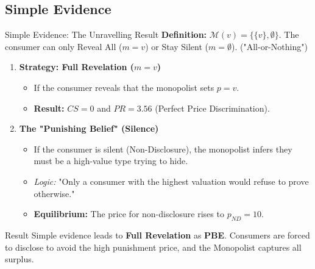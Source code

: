 \documentclass{beamer}
\begin{document}
\subsection{Simple Evidence}
\begin{frame}{Simple Evidence: The Unravelling Result}
    \textbf{Definition:} $\mathcal{M}(v) = \{ \{v\}, \emptyset \}$. The consumer can only Reveal All ($m=v$) or Stay Silent ($m=\emptyset$). ("All-or-Nothing")

    \vspace{0.3cm}

    \begin{enumerate}
        \item \textbf{Strategy: Full Revelation ($m=v$)}
        \begin{itemize}
            \item If the consumer reveals that the monopolist sets $p=v$.
            \item \textbf{Result:} $CS=0$ and $PR = 3.56$ (Perfect Price Discrimination).
        \end{itemize}
        
        \vspace{0.2cm}
        \item \textbf{The "Punishing Belief" (Silence)}
        \begin{itemize}
            \item If the consumer is silent (Non-Disclosure), the monopolist infers they must be a high-value type trying to hide.
            \item \textit{Logic:} "Only a consumer with the highest valuation would refuse to prove otherwise."
            \item \textbf{Equilibrium:} The price for non-disclosure rises to $p_{ND} = 10$.
        \end{itemize}
    \end{enumerate}

    \begin{alertblock}{Result}
        Simple evidence leads to \textbf{Full Revelation} as \textbf{PBE}. Consumers are forced to disclose to avoid the high punishment price, and the Monopolist captures all surplus.
    \end{alertblock}
\end{frame}
\end{document}
